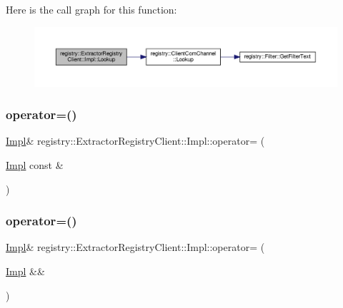 Here is the call graph for this function\+:
\nopagebreak
\begin{figure}[H]
\begin{center}
\leavevmode
\includegraphics[width=350pt]{classregistry_1_1ExtractorRegistryClient_1_1Impl_aee705dc8ca2a3056bbb45ef25c57de16_cgraph}
\end{center}
\end{figure}
\mbox{\label{classregistry_1_1ExtractorRegistryClient_1_1Impl_aa074380885dd859576d3dec0bb6428fd}} 
\subsubsection{\texorpdfstring{operator=()}{operator=()}\hspace{0.1cm}{\footnotesize\ttfamily [1/2]}}
{\footnotesize\ttfamily \hyperlink{classregistry_1_1ExtractorRegistryClient_1_1Impl}{Impl}\& registry\+::\+Extractor\+Registry\+Client\+::\+Impl\+::operator= (\begin{DoxyParamCaption}\item[{\hyperlink{classregistry_1_1ExtractorRegistryClient_1_1Impl}{Impl} const \&}]{ }\end{DoxyParamCaption})\hspace{0.3cm}{\ttfamily [delete]}}

\mbox{\label{classregistry_1_1ExtractorRegistryClient_1_1Impl_aada6bfc4a190dc51f62f1ab00b9159af}} 
\subsubsection{\texorpdfstring{operator=()}{operator=()}\hspace{0.1cm}{\footnotesize\ttfamily [2/2]}}
{\footnotesize\ttfamily \hyperlink{classregistry_1_1ExtractorRegistryClient_1_1Impl}{Impl}\& registry\+::\+Extractor\+Registry\+Client\+::\+Impl\+::operator= (\begin{DoxyParamCaption}\item[{\hyperlink{classregistry_1_1ExtractorRegistryClient_1_1Impl}{Impl} \&\&}]{ }\end{DoxyParamCaption})\hspace{0.3cm}{\ttfamily [delete]}}

